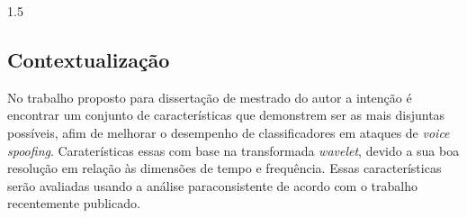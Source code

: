 \documentclass[a4paper,12pt,openright,oneside]{book}
\newenvironment{myenv}[1]
  {\begin{spacing}{#1}}
  {\end{spacing}}
\begin{document}
\begin{myenv}{1.5}
			\subsection{Contextualização}
			\par No trabalho proposto para dissertação de mestrado do autor a intenção é encontrar um conjunto de características que demonstrem ser as mais disjuntas possíveis, afim de melhorar o desempenho de classificadores em ataques de \textit{voice spoofing}. Caraterísticas essas com base na transformada \textit{wavelet}, devido a sua boa resolução em relação às dimensões de tempo e frequência. Essas características serão avaliadas usando a análise paraconsistente de acordo com o trabalho \cite{8588433} recentemente publicado.

		\end{myenv}
\end{document}
